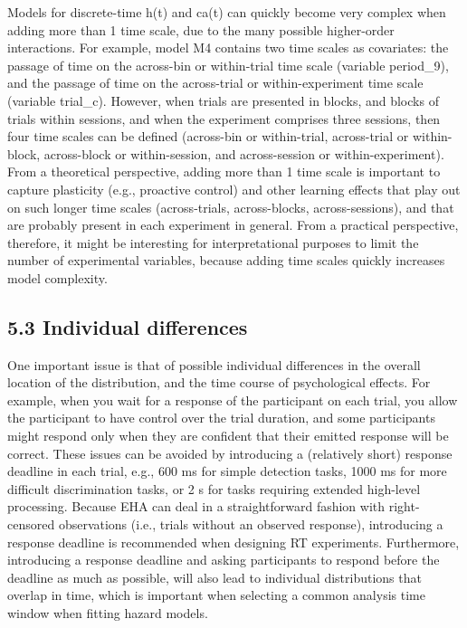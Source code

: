 \documentclass[
  man,floatsintext]{apa6}
\begin{document}
Models for discrete-time h(t) and ca(t) can quickly become very complex when adding more than 1 time scale, due to the many possible higher-order interactions.
For example, model M4 contains two time scales as covariates: the passage of time on the across-bin or within-trial time scale (variable period\_9), and the passage of time on the across-trial or within-experiment time scale (variable trial\_c). However, when trials are presented in blocks, and blocks of trials within sessions, and when the experiment comprises three sessions, then four time scales can be defined (across-bin or within-trial, across-trial or within-block, across-block or within-session, and across-session or within-experiment).
From a theoretical perspective, adding more than 1 time scale is important to capture plasticity (e.g., proactive control) and other learning effects that play out on such longer time scales (across-trials, across-blocks, across-sessions), and that are probably present in each experiment in general.
From a practical perspective, therefore, it might be interesting for interpretational purposes to limit the number of experimental variables, because adding time scales quickly increases model complexity.

\subsection{5.3 Individual differences}\label{individual-differences}

One important issue is that of possible individual differences in the overall location of the distribution, and the time course of psychological effects. For example, when you wait for a response of the participant on each trial, you allow the participant to have control over the trial duration, and some participants might respond only when they are confident that their emitted response will be correct. These issues can be avoided by introducing a (relatively short) response deadline in each trial, e.g., 600 ms for simple detection tasks, 1000 ms for more difficult discrimination tasks, or 2 s for tasks requiring extended high-level processing. Because EHA can deal in a straightforward fashion with right-censored observations (i.e., trials without an observed response), introducing a response deadline is recommended when designing RT experiments. Furthermore, introducing a response deadline and asking participants to respond before the deadline as much as possible, will also lead to individual distributions that overlap in time, which is important when selecting a common analysis time window when fitting hazard models.
\end{document}
